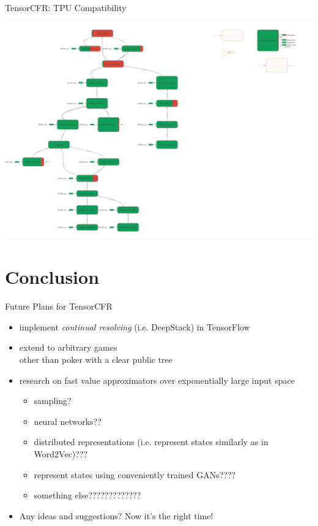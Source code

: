 \documentclass{beamer}
\begin{document}
{    \begin{frame}{TensorCFR: TPU Compatibility}
      \begin{center}
        \includegraphics[width=\textwidth]{../img/tensorcfr_tpu.png}
      \end{center}
    \end{frame}
  }


  \section{Conclusion}

  \begin{frame}{Future Plans for TensorCFR}
    \begin{itemize}[<+- | alert@+>]
      \item implement \emph{continual resolving} (i.e. DeepStack) in TensorFlow
      \item extend to arbitrary games\\
        {\tiny other than poker with a clear public tree}
      \item research on fast value approximators over exponentially large input space
        \begin{itemize}[<+- | alert@+>]
          \item sampling?
          \item neural networks??
          \item distributed representations (i.e. represent states similarly as in Word2Vec)???
          \item represent states using conveniently trained GANs????
          \item something else?????????????
        \end{itemize}
      \item Any ideas and suggestions?
        \pause
        Now it's the right time!
    \end{itemize}
  \end{frame}
\end{document}
